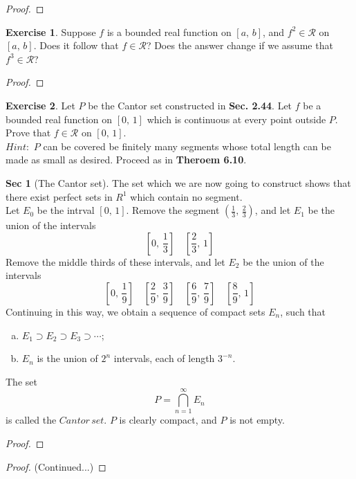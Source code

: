 \documentclass[12pt]{book}
\theoremstyle{definition}
\newtheorem{exe}{Exercise}
\newtheorem{sect}{Sec}
\begin{document}
	\begin{proof}
	\end{proof}
	\newpage
	\begin{exe}
		Suppose $f$ is a bounded real function on $[a,\,b]$, and $f^2\in\mathscr{R}$ on $[a,\,b]$. Does it follow that $f\in\mathscr{R}$? Does the answer change if we assume that $f^3\in\mathscr{R}$?
	\end{exe}
	\begin{proof}
	\end{proof}
	\newpage
	\begin{exe}
		Let $P$ be the Cantor set constructed in \textbf{Sec. 2.44}. Let $f$ be a bounded real function on $[0,\,1]$ which is continuous at every point outside $P$. Prove that $f\in\mathscr{R}$ on $[0,\,1]$.
		\\$Hint:$ $P$ can be covered be finitely many segments whose total length can be made as small as desired. Proceed as in \textbf{Theroem 6.10}.
	\end{exe}
	\setcounter{sect}{43}
	\begin{sect}[The Cantor set]
		The set which we are now going to construct shows that there exist perfect sets in $R^1$ which contain no segment.\\
		Let $E_0$ be the intrval $[0,\,1]$. Remove the segment $(\frac{1}{3},\,\frac{2}{3})$, and let $E_1$ be the union of the intervals \begin{equation*}
			\left[0,\,\frac{1}{3}\right]\quad \left[\frac{2}{3},\,1\right]
		\end{equation*}
		Remove the middle thirds of these intervals, and let $E_2$ be the union of the intervals $$\left[0,\,\frac{1}{9}\right]\quad \left[\frac{2}{9},\,\frac{3}{9}\right]\quad \left[\frac{6}{9},\,\frac{7}{9}\right]\quad \left[\frac{8}{9},\,1\right]$$
		Continuing in this way, we obtain a sequence of compact sets $E_n$, such that
		\begin{enumerate}[(a)]
			\item $E_1\supset E_2\supset E_3\supset\cdots$;
			\item $E_n$ is the union of $2^n$ intervals, each of length $3^{-n}$.
		\end{enumerate}
		The set $$P=\displaystyle\bigcap_{n=1}^\infty E_n$$ is called the $Cantor\, set$. $P$ is clearly compact, and $P$ is not empty.
	\end{sect}
	\begin{proof}
	\end{proof}
	\newpage
	\begin{proof}(Continued...)
	\end{proof}
\end{document}

